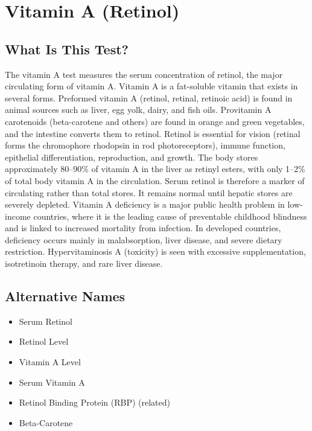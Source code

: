 \chapter{Vitamin A (Retinol)}

\section*{What Is This Test?}
The vitamin A test measures the serum concentration of retinol, the major circulating form of vitamin A. Vitamin A is a fat-soluble vitamin that exists in several forms. Preformed vitamin A (retinol, retinal, retinoic acid) is found in animal sources such as liver, egg yolk, dairy, and fish oils. Provitamin A carotenoids (beta-carotene and others) are found in orange and green vegetables, and the intestine converts them to retinol. Retinol is essential for vision (retinal forms the chromophore rhodopsin in rod photoreceptors), immune function, epithelial differentiation, reproduction, and growth. The body stores approximately 80--90\% of vitamin A in the liver as retinyl esters, with only 1--2\% of total body vitamin A in the circulation. Serum retinol is therefore a marker of circulating rather than total stores. It remains normal until hepatic stores are severely depleted. Vitamin A deficiency is a major public health problem in low-income countries, where it is the leading cause of preventable childhood blindness and is linked to increased mortality from infection. In developed countries, deficiency occurs mainly in malabsorption, liver disease, and severe dietary restriction. Hypervitaminosis A (toxicity) is seen with excessive supplementation, isotretinoin therapy, and rare liver disease.

\section*{Alternative Names}
\begin{itemize}
  \item Serum Retinol
  \item Retinol Level
  \item Vitamin A Level
  \item Serum Vitamin A
  \item Retinol Binding Protein (RBP) (related)
  \item Beta-Carotene
\end{itemize}
